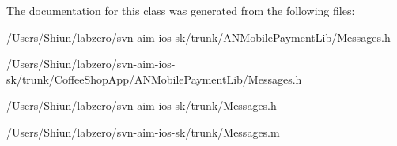 The documentation for this class was generated from the following files:\begin{DoxyCompactItemize}
\item 
/Users/Shiun/labzero/svn-\/aim-\/ios-\/sk/trunk/ANMobilePaymentLib/Messages.h\item 
/Users/Shiun/labzero/svn-\/aim-\/ios-\/sk/trunk/CoffeeShopApp/ANMobilePaymentLib/Messages.h\item 
/Users/Shiun/labzero/svn-\/aim-\/ios-\/sk/trunk/Messages.h\item 
/Users/Shiun/labzero/svn-\/aim-\/ios-\/sk/trunk/Messages.m\end{DoxyCompactItemize}
